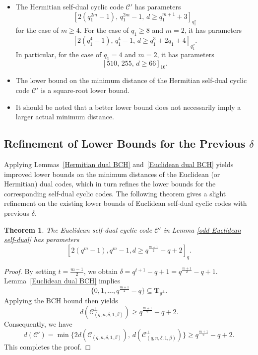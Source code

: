 \documentclass[10pt,a4paper]{amsart}
\newtheorem{theorem}{Theorem}
\begin{document}
\begin{itemize}
    \item The Hermitian self-dual cyclic code $\mathcal{C}'$ has parameters
    \[
    [2(q_1^{2m} - 1),\, q_1^{2m} - 1,\, d \ge q_1^{m+1} + 3]_{q_1^2}
    \]
    for the case of $m \ge 4$. For the case of $q_1 \ge 8$ and $m = 2$, it has parameters
    \[
    [2(q_1^4 - 1),\, q_1^4 - 1,\, d \ge q_1^3 + 2q_1 + 4]_{q_1^2}.
    \]
    In particular, for the case of $q_1 = 4$ and $m = 2$, it has parameters
    \[
    [510,\, 255,\, d \ge 66]_{16}.
    \]
    \item The lower bound on the minimum distance of the Hermitian self-dual cyclic code $\mathcal{C}'$ is a square-root lower bound.
    \item It should be noted that a better lower bound does not necessarily imply a larger actual minimum distance.
\end{itemize}

\subsection{Refinement of Lower Bounds for the Previous $\delta$}

Applying Lemmas~\ref{Hermitian dual BCH} and~\ref{Euclidean dual BCH} yields improved lower bounds on the minimum distances of the Euclidean (or Hermitian) dual codes, which in turn refines the lower bounds for the corresponding self-dual cyclic codes. The following theorem gives a slight refinement on the existing lower bounds of Euclidean self-dual cyclic codes with previous $\delta$.

\begin{theorem}
    \label{new Euclidean odd}
    The Euclidean self-dual cyclic code $\mathcal{C}'$ in Lemma \ref{odd Euclidean self-dual} has parameters \[[2(q^m-1),q^m-1,d\ge q^\frac{m+1}{2}-q+2]_q.\]
\end{theorem}

\begin{proof}
    By setting $t = \frac{m-1}{2}$, we obtain $\delta = q^{t+1} - q + 1 = q^{\frac{m+1}{2}} - q + 1$. Lemma~\ref{Euclidean dual BCH} implies
\[
\{0,1,\dots,q^{\frac{m+1}{2}} - q\} \subseteq \mathbf{T}_{g^\perp}.
\]
Applying the BCH bound then yields
\[
d(\mathcal{C}^\perp_{(q,n,\delta,1,\beta)}) \ge q^{\frac{m+1}{2}} - q + 2.
\]
Consequently, we have
\[
d(\mathcal{C}') = \min\{2d(\mathcal{C}_{(q,n,\delta,1,\beta)}),\, d(\mathcal{C}^\perp_{(q,n,\delta,1,\beta)})\} \ge q^{\frac{m+1}{2}} - q + 2.
\]
This completes the proof.
\end{proof}
\end{document}
